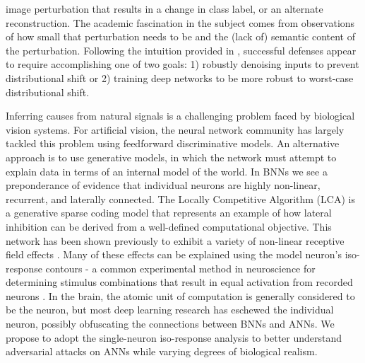 image perturbation that results in a change in class label, or an alternate reconstruction. The academic fascination in the subject comes from observations of how small that perturbation needs to be and the (lack of) semantic content of the perturbation. Following the intuition provided in \parencite{ford2019adversarial}, successful defenses appear to require accomplishing one of two goals: 1) robustly denoising inputs to prevent distributional shift or 2) training deep networks to be more robust to worst-case distributional shift.

Inferring causes from natural signals is a challenging problem faced by biological vision systems. For artificial vision, the neural network community has largely tackled this problem using feedforward discriminative models. An alternative approach is to use generative models, in which the network must attempt to explain data in terms of an internal model of the world. In BNNs we see a preponderance of evidence that individual neurons are highly non-linear, recurrent, and laterally connected. The Locally Competitive Algorithm (LCA) \parencite{rozell2008sparse} is a generative sparse coding model that represents an example of how lateral inhibition can be derived from a well-defined computational objective. This network has been shown previously to exhibit a variety of non-linear receptive field effects \parencite{zhu2013visual}. Many of these effects can be explained using the model neuron’s iso-response contours - a common experimental method in neuroscience for determining stimulus combinations that result in equal activation from recorded neurons \parencite{golden2016conjectures}. In the brain, the atomic unit of computation is generally considered to be the neuron, but most deep learning research has eschewed the individual neuron, possibly obfuscating the connections between BNNs and ANNs. We propose to adopt the single-neuron iso-response analysis to better understand adversarial attacks on ANNs while varying degrees of biological realism.

